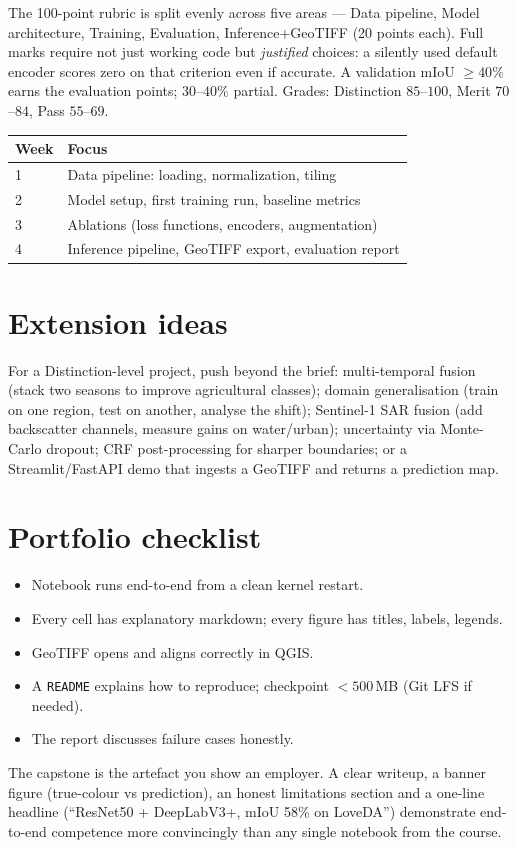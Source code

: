 The 100-point rubric is split evenly across five areas --- Data pipeline, Model
architecture, Training, Evaluation, Inference+GeoTIFF (20 points each). Full
marks require not just working code but \emph{justified} choices: a silently used
default encoder scores zero on that criterion even if accurate. A validation
mIoU $\geq 40\%$ earns the evaluation points; $30$--$40\%$ partial.
Grades: Distinction $85$--$100$, Merit $70$--$84$, Pass $55$--$69$.

\begin{center}\small
\renewcommand{\arraystretch}{1.15}
\begin{tabular}{@{}ll@{}}
\toprule
Week & Focus\\
\midrule
1 & Data pipeline: loading, normalization, tiling\\
2 & Model setup, first training run, baseline metrics\\
3 & Ablations (loss functions, encoders, augmentation)\\
4 & Inference pipeline, GeoTIFF export, evaluation report\\
\bottomrule
\end{tabular}
\end{center}

\section{Extension ideas}

For a Distinction-level project, push beyond the brief:
multi-temporal fusion (stack two seasons to improve agricultural classes);
domain generalisation (train on one region, test on another, analyse the shift);
Sentinel-1 SAR fusion (add backscatter channels, measure gains on water/urban);
uncertainty via Monte-Carlo dropout; CRF post-processing for sharper boundaries;
or a Streamlit/FastAPI demo that ingests a GeoTIFF and returns a prediction map.

\section{Portfolio checklist}

\begin{itemize}[leftmargin=1.4em,nosep]
  \item Notebook runs end-to-end from a clean kernel restart.
  \item Every cell has explanatory markdown; every figure has titles, labels, legends.
  \item GeoTIFF opens and aligns correctly in QGIS.
  \item A \texttt{README} explains how to reproduce; checkpoint $<500$\,MB (Git LFS if needed).
  \item The report discusses failure cases honestly.
\end{itemize}

\begin{notebox}
The capstone is the artefact you show an employer. A clear writeup, a
banner figure (true-colour vs prediction), an honest limitations section and a
one-line headline (``ResNet50 + DeepLabV3+, mIoU 58\% on LoveDA'') demonstrate
end-to-end competence more convincingly than any single notebook from the course.
\end{notebox}

